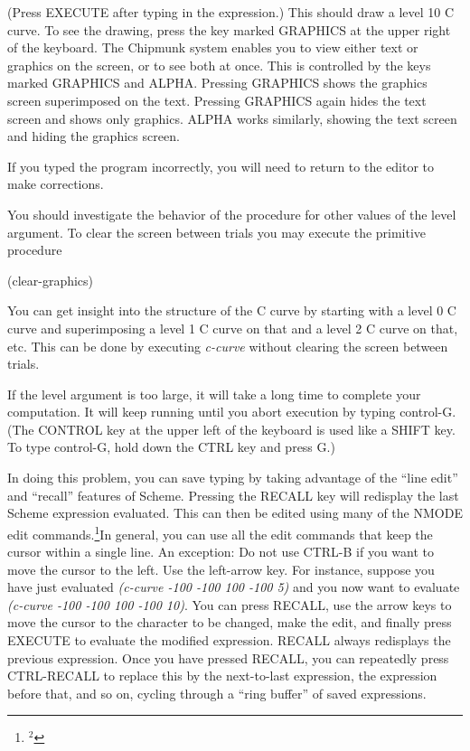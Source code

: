 (Press EXECUTE after typing in the expression.)  This should draw a
level 10 C curve.  To see the drawing, press the key marked GRAPHICS at the
upper right of the keyboard.  The Chipmunk system enables you to view
either text or graphics on the screen, or to see both at once.  This
is controlled by the keys marked GRAPHICS and ALPHA.  Pressing
GRAPHICS shows the graphics screen superimposed on the text.  Pressing
GRAPHICS again hides the text screen and shows only graphics.  ALPHA
works similarly, showing the text screen and hiding the graphics
screen.

If you typed the program incorrectly, you will need to return to the
editor to make corrections.

You should investigate the behavior of the procedure for other values of the
level argument.  To clear the screen between trials you may execute
the primitive procedure

\beginlisp
(clear-graphics)
\endlisp

You can get insight into the structure of the C curve by starting with
a level 0 C curve and superimposing a level 1 C curve on that and a level
2 C curve on that, etc.  This can be done by executing {\it c-curve} without
clearing the screen between trials.

If the level argument is too large, it will take a long time to
complete your computation.  It will keep running until you abort
execution by typing control-G.  (The CONTROL key at the upper left
of the keyboard is used like a SHIFT key.  To type control-G, hold
down the CTRL key and press G.)

In doing this problem, you can save typing by taking advantage of the
``line edit'' and ``recall'' features of Scheme.  Pressing the
RECALL key will redisplay the last Scheme expression evaluated.
This can then be edited using many of the NMODE edit commands.\footnote{$^2$}{In
general, you can use all the edit commands that keep the cursor within
a single line.  An exception: Do not use CTRL-B if you want to
move the cursor to the left.  Use the left-arrow key.} For instance,
suppose you have just evaluated {\it (c-curve -100 -100 100 -100 5)} 
and you now want to evaluate {\it (c-curve -100 -100 100 -100 10)}.  
You can press RECALL,
use the arrow keys to move the cursor to the character to be changed,
make the edit, and finally press EXECUTE to evaluate the modified
expression.  RECALL always redisplays the previous expression.
Once you have pressed RECALL, you can repeatedly press
CTRL-RECALL to replace this by the next-to-last expression, the
expression before that, and so on, cycling through a ``ring buffer''
of saved expressions.

